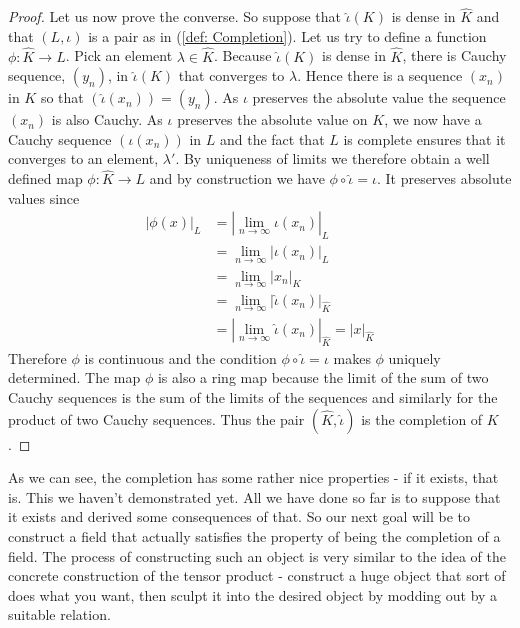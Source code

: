 \documentclass{article}
\begin{document}
\begin{proof}
    Let us now prove the converse. So suppose that $\hat \iota (K)$ is dense in $\hat K$ and that $(L, \iota)$ is a pair as in (\ref{def: Completion}). Let us try to define a function $\phi : \hat K \to L$. Pick an element $\lambda \in \hat K$. Because $\hat \iota (K)$ is dense in $\hat K$, there is Cauchy sequence, $(y_n)$, in $\hat \iota (K)$ that converges to $\lambda$. Hence there is a sequence $(x_n)$ in $K$ so that $(\hat \iota(x_n)) = (y_n)$. As $\iota$ preserves the absolute value the sequence $(x_n)$ is also Cauchy. As $\iota$ preserves the absolute value on $K$, we now have a Cauchy sequence $(\iota(x_n))$ in $L$ and the fact that $L$ is complete ensures that it converges to an element, $\lambda'$. By uniqueness of limits we therefore obtain a well defined map $\phi : \hat K \to L$ and by construction we have $\phi \circ \hat \iota = \iota$. It preserves absolute values since 
    \begin{align*}
        |\phi(x)|_{L} &= |\lim_{n \to \infty} \iota(x_n)|_{L} \\
        &= \lim_{n \to \infty} |\iota(x_n)|_{L} \\ 
        &= \lim_{n \to \infty} |x_n|_{K} \\
        &= \lim_{n \to \infty} |\hat \iota(x_n)|_{\hat K} \\
        &= |\lim_{n \to \infty} \hat \iota(x_n)|_{\hat K} = |x|_{\hat K}
    \end{align*}
    Therefore $\phi$ is continuous and the condition $\phi \circ \hat \iota = \iota$ makes $\phi$ uniquely determined. The map $\phi$ is also a ring map because the limit of the sum of two Cauchy sequences is the sum of the limits of the sequences and similarly for the product of two Cauchy sequences. Thus the pair $(\hat K, \hat \iota)$ is the completion of $K$. 
\end{proof}
As we can see, the completion has some rather nice properties - if it exists, that is. This we haven't demonstrated yet. All we have done so far is to suppose that it exists and derived some consequences of that. So our next goal will be to construct a field that actually satisfies the property of being the completion of a field. The process of constructing such an object is very similar to the idea of the concrete construction of the tensor product - construct a huge object that sort of does what you want, then sculpt it into the desired object by modding out by a suitable relation.
\end{document}
